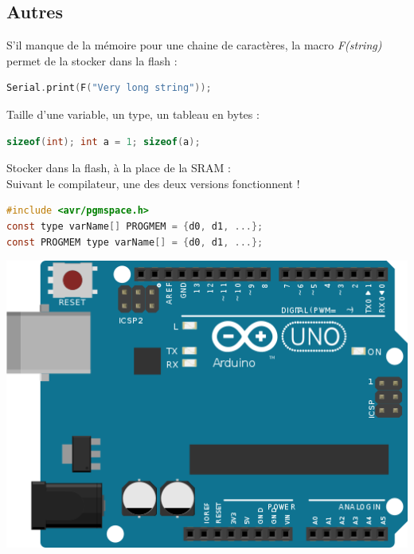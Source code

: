         \subsection{Autres}
            \bmar
                S'il manque de la mémoire pour une chaine de caractères, la macro \textit{F(string)} permet de la stocker dans la flash :
            \emar
            \begin{lstlisting}[language=C]
Serial.print(F("Very long string"));
            \end{lstlisting}
            \bmar
                Taille d'une variable, un type, un tableau en bytes :
            \emar
            \begin{lstlisting}[language=C]
sizeof(int); int a = 1; sizeof(a);
            \end{lstlisting}
            \bmar
                Stocker dans la flash, à la place de la SRAM :\\
                Suivant le compilateur, une des deux versions fonctionnent !
            \emar
            \begin{lstlisting}[language=C]
#include <avr/pgmspace.h>
const type varName[] PROGMEM = {d0, d1, ...};
const PROGMEM type varName[] = {d0, d1, ...};
            \end{lstlisting}



            \begin{center}
                \includegraphics[scale=0.6]{img/arduino-uno-frietzing}
            \end{center}
    
